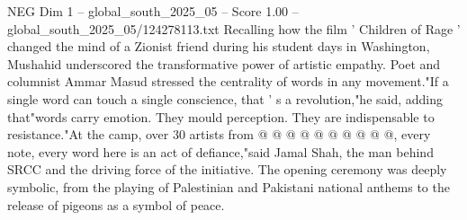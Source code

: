 \begin{textsample}{NEG Dim 1 – global\_south\_2025\_05 – Score 1.00 – global\_south\_2025\_05/124278113.txt}
Recalling how the film ' Children of Rage ' changed the mind of a Zionist friend during his student days in Washington, Mushahid underscored the transformative power of artistic empathy.
Poet and columnist Ammar Masud stressed the centrality of words in any movement."If a single word can touch a single conscience, that ' s a revolution,"he said, adding that"words carry emotion.
They mould perception.
They are indispensable to resistance."At the camp, over 30 artists from @ @ @ @ @ @ @ @ @ @, every note, every word here is an act of defiance,"said Jamal Shah, the man behind SRCC and the driving force of the initiative.
The opening ceremony was deeply symbolic, from the playing of Palestinian and Pakistani national anthems to the release of pigeons as a symbol of peace.

\end{textsample}
